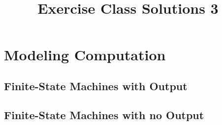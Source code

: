 \documentclass[11pt,a4paper]{article}
\newcommand{\chapter}[2]{%
\setcounter{section}{#1-1}%
\section{#2}%
}
\newcommand{\subchapter}[2]{%
\setcounter{subsection}{#1-1}%
\subsection{#2}%
}
\begin{document}
\title{Exercise Class Solutions 3}
\date{}
\author{}
\maketitle

\chapter{13}{Modeling Computation}
	\subchapter{2}{Finite-State Machines with Output}
		
		\pagebreak
	\subchapter{3}{Finite-State Machines with no Output}
		
		
		\pagebreak
		
		
		\pagebreak
		
		
		\pagebreak
		
		
		\pagebreak
		
		
		\pagebreak
		
		
		\pagebreak
		
		
\end{document}

